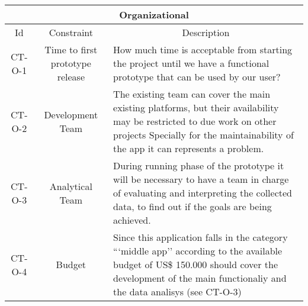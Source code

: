 \begin{table}[H]
    \begin{tabularx}{\textwidth}{|c|c|X|}
        \hline
        \multicolumn{3}{c}{\textbf{Organizational}} \\
        \hline
        \toprule
        \multicolumn{1}{c}{Id} & \multicolumn{1}{c}{Constraint} & \multicolumn{1}{c}{Description} \\
        \midrule
        CT-O-1 & Time to first prototype release & How much time is acceptable from starting the project
        until we have a functional prototype that can be used by our user? \\
        CT-O-2 & Development Team & The existing team can cover the main existing platforms, but their availability
        may be restricted to due work on other projects Specially for the maintainability of the app it can represents
        a problem. \\
        CT-O-3 & Analytical Team & During running phase of the prototype it will be necessary to have a team in charge
        of evaluating and interpreting the collected data, to find out if the goals are being achieved. \\
        CT-O-4 & Budget & Since this application falls in the category ```middle app'' according to \cite{refonline:SPDLOAD}
        the available budget of US\$ 150.000 should cover the development of the main functionaliy and the data analisys 
        (see CT-O-3) \\
        \bottomrule
    \end{tabularx}
\end{table}












